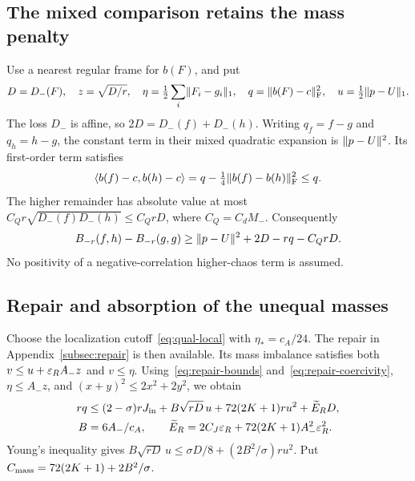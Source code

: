 \subsection{The mixed comparison retains the mass penalty}
Use a nearest regular frame for $b(F)$, and put
\[
 D=D_-(F),\quad z=\sqrt{D/r},\quad
 \eta=\tfrac12\sum_i\lVert F_i-g_i\rVert_1,\quad
 q=\lVert b(F)-c\rVert_{\mathrm F}^2,\quad u=\tfrac12\lVert p-U\rVert_1.
\]
The loss $D_-$ is affine, so $2D=D_-(f)+D_-(h)$.
Writing $q_f=f-g$ and $q_h=h-g$, the constant term in their mixed quadratic
expansion is $\lVert p-U\rVert^2$. Its first-order term satisfies
\[
 \langle b(f)-c,b(h)-c\rangle
 =q-\tfrac14\lVert b(f)-b(h)\rVert_{\mathrm F}^2\leq q.
\]
The higher remainder has absolute value at most
$C_Qr\sqrt{D_-(f)D_-(h)}\leq C_QrD$, where $C_Q=C_dM_-$.
Consequently
\begin{equation}\label{eq:negative-comparison}
 B_{-r}(f,h)-B_{-r}(g,g)
 \geq\lVert p-U\rVert^2+2D-rq-C_QrD.
\end{equation}
No positivity of a negative-correlation higher-chaos term is assumed.

\subsection{Repair and absorption of the unequal masses}
Choose the localization cutoff~\eqref{eq:qual-local} with $\eta_*=c_A/24$.
The repair in Appendix~\ref{subsec:repair} is then available. Its mass
imbalance satisfies both $v\leq u+\varepsilon_RA_-z$ and $v\leq\eta$.
Using~\eqref{eq:repair-bounds} and~\eqref{eq:repair-coercivity},
$\eta\leq A_-z$, and $(x+y)^2\leq2x^2+2y^2$, we obtain
\begin{align}
 rq&\leq(2-\sigma)rJ_{\rm in}+B\sqrt{rD}\,u
                  +72(2K+1)ru^2+\widetilde E_RD,\label{eq:negative-rq}\\
 B&=6A_-/c_A,\qquad
 \widetilde E_R=2C_J\varepsilon_R+72(2K+1)A_-^2\varepsilon_R^2.\nonumber
\end{align}
Young's inequality gives
$B\sqrt{rD}\,u\leq\sigma D/8+(2B^2/\sigma)ru^2$.
Put $C_{\rm mass}=72(2K+1)+2B^2/\sigma$.

